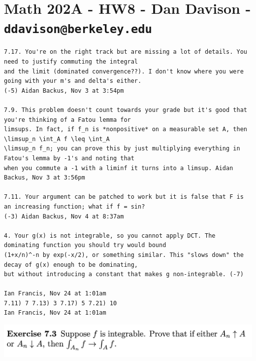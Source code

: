 \section{Math 202A - HW8 - Dan Davison - \texttt{ddavison@berkeley.edu}}


\begin{verbatim}
7.17. You're on the right track but are missing a lot of details. You need to justify commuting the integral
and the limit (dominated convergence??). I don't know where you were going with your m's and delta's either.
(-5) Aidan Backus, Nov 3 at 3:54pm

7.9. This problem doesn't count towards your grade but it's good that you're thinking of a Fatou lemma for
limsups. In fact, if f_n is *nonpositive* on a measurable set A, then \limsup_n \int_A f \leq \int_A
\limsup_n f_n; you can prove this by just multiplying everything in Fatou's lemma by -1's and noting that
when you commute a -1 with a liminf it turns into a limsup. Aidan Backus, Nov 3 at 3:56pm

7.11. Your argument can be patched to work but it is false that F is an increasing function; what if f = sin?
(-3) Aidan Backus, Nov 4 at 8:37am

4. Your g(x) is not integrable, so you cannot apply DCT. The dominating function you should try would bound
(1+x/n)^-n by exp(-x/2), or something similar. This "slows down" the decay of g(x) enough to be dominating,
but without introducing a constant that makes g non-integrable. (-7)

Ian Francis, Nov 24 at 1:01am
7.11) 7 7.13) 3 7.17) 5 7.21) 10
Ian Francis, Nov 24 at 1:01am
\end{verbatim}

\begin{mdframed}
\includegraphics[width=400pt]{img/analysis--berkeley-202a-hw08-2798.png}
\end{mdframed}

